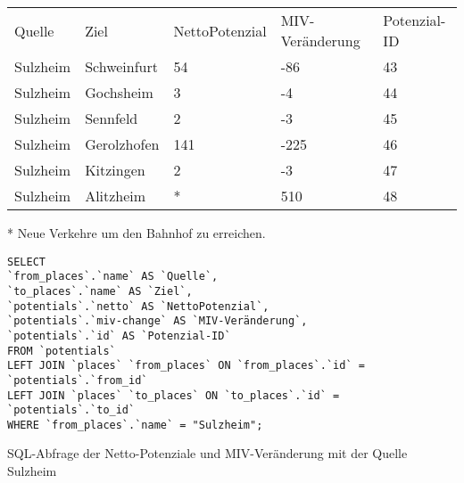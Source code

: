 \begin{tabular}{ l  l  l  l  l }
Quelle & Ziel & NettoPotenzial & MIV-Veränderung & Potenzial-ID\\ 
Sulzheim & Schweinfurt & 54 & -86 & 43\\ 
Sulzheim & Gochsheim & 3 & -4 & 44\\ 
Sulzheim & Sennfeld & 2 & -3 & 45\\ 
Sulzheim & Gerolzhofen & 141 & -225 & 46\\ 
Sulzheim & Kitzingen & 2 & -3 & 47\\ 
Sulzheim & Alitzheim & * & 510 & 48\\ 
\end{tabular}    
\newline
\newline
* Neue Verkehre um den Bahnhof zu erreichen.
\newline
\begin{listing}[htbp]
\begin{verbatim}
SELECT
`from_places`.`name` AS `Quelle`, 
`to_places`.`name` AS `Ziel`, 
`potentials`.`netto` AS `NettoPotenzial`, 
`potentials`.`miv-change` AS `MIV-Veränderung`, 
`potentials`.`id` AS `Potenzial-ID`
FROM `potentials`
LEFT JOIN `places` `from_places` ON `from_places`.`id` = `potentials`.`from_id`
LEFT JOIN `places` `to_places` ON `to_places`.`id` = `potentials`.`to_id`
WHERE `from_places`.`name` = "Sulzheim";
\end{verbatim}
\caption{SQL-Abfrage der Netto-Potenziale und MIV-Veränderung mit der Quelle Sulzheim}\label{lst-fz-sulzheim}
\end{listing}